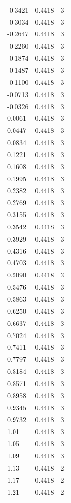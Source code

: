 \begin{longtable}{lrr}
  -0.3421 & 0.4418 & 3 \\
  -0.3034 & 0.4418 & 3 \\
  -0.2647 & 0.4418 & 3 \\
  -0.2260 & 0.4418 & 3 \\
  -0.1874 & 0.4418 & 3 \\
  -0.1487 & 0.4418 & 3 \\
  -0.1100 & 0.4418 & 3 \\
  -0.0713 & 0.4418 & 3 \\
  -0.0326 & 0.4418 & 3 \\
  0.0061 & 0.4418 & 3 \\
  0.0447 & 0.4418 & 3 \\
  0.0834 & 0.4418 & 3 \\
  0.1221 & 0.4418 & 3 \\
  0.1608 & 0.4418 & 3 \\
  0.1995 & 0.4418 & 3 \\
  0.2382 & 0.4418 & 3 \\
  0.2769 & 0.4418 & 3 \\
  0.3155 & 0.4418 & 3 \\
  0.3542 & 0.4418 & 3 \\
  0.3929 & 0.4418 & 3 \\
  0.4316 & 0.4418 & 3 \\
  0.4703 & 0.4418 & 3 \\
  0.5090 & 0.4418 & 3 \\
  0.5476 & 0.4418 & 3 \\
  0.5863 & 0.4418 & 3 \\
  0.6250 & 0.4418 & 3 \\
  0.6637 & 0.4418 & 3 \\
  0.7024 & 0.4418 & 3 \\
  0.7411 & 0.4418 & 3 \\
  0.7797 & 0.4418 & 3 \\
  0.8184 & 0.4418 & 3 \\
  0.8571 & 0.4418 & 3 \\
  0.8958 & 0.4418 & 3 \\
  0.9345 & 0.4418 & 3 \\
  0.9732 & 0.4418 & 3 \\
  1.01 & 0.4418 & 3 \\
  1.05 & 0.4418 & 3 \\
  1.09 & 0.4418 & 3 \\
  1.13 & 0.4418 & 2 \\
  1.17 & 0.4418 & 2 \\
  1.21 & 0.4418 & 2 \\

\end{longtable}
